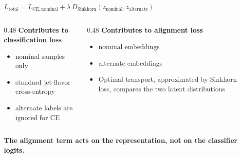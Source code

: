 \begin{frame}[plain]

  \vspace{15mm}
  \begin{center}
    {\large\textbf{$L_{\mathrm{total}} = L_{\mathrm{CE, nominal}} + \lambda\,D_{\mathrm{Sinkhorn}}(z_{\mathrm{nominal}}, z_{\mathrm{alternate}})$}}
  \end{center}

  \vspace{5mm}
  \begin{columns}[T,totalwidth=\textwidth]
    \begin{column}{0.48\textwidth}
      {\small\textbf{Contributes to classification loss}}\par
      \begin{itemize}\tightlist
        \item nominal samples only
        \item standard jet-flavor cross-entropy
        \item alternate labels are ignored for CE
      \end{itemize}
    \end{column}
    \begin{column}{0.48\textwidth}
      {\small\textbf{Contributes to alignment loss}}\par
      \begin{itemize}\tightlist
        \item nominal embeddings
        \item alternate embeddings
        \item Optimal transport, approximated by Sinkhorn loss, compares the two latent distributions
      \end{itemize}
    \end{column}
  \end{columns}

  \vspace{5mm}
  \begin{center}
    {\small\color{argonneBlue}\textbf{The alignment term acts on the representation, not on the classifier logits.}}
  \end{center}

  \slideheaderfooter
\end{frame}

